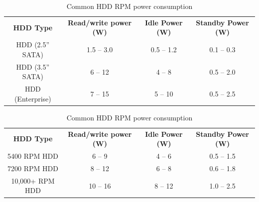 \begin{table}[H]
    \centering

    \begin{subtable}[t]{\textwidth}
        \centering
        \begin{tabular}{ |c|c|c|c| } 
            \hline
            \textbf{HDD Type} & \textbf{Read/write power (W)} & \textbf{Idle Power (W)} & \textbf{Standby Power (W)} \\
            \Xhline{1.5pt}
            HDD (2.5'' SATA) & 1.5 -- 3.0 & 0.5 -- 1.2 & 0.1 -- 0.3 \\
            \hline
            HDD (3.5'' SATA) & 6 -- 12 & 4 -- 8 & 0.5 -- 2.0 \\
            \hline
            HDD (Enterprise) & 7 -- 15 & 5 -- 10 & 0.5 -- 2.5 \\
            \hline
        \end{tabular}
        \caption[Typical HDD power consumption]{Typical HDD power consumption\parencite{storedbits_hdd}}
        \label{tab:Storage_power_HDD}
    \end{subtable}

    \vspace{1em}

    \begin{subtable}[t]{\textwidth}
        \centering
        \begin{tabular}{ |c|c|c|c| } 
            \hline
            \textbf{HDD Type} & \textbf{Read/write power (W)} & \textbf{Idle Power (W)} & \textbf{Standby Power (W)} \\
            \Xhline{1.5pt}
            5400 RPM HDD & 6 -- 9 & 4 -- 6 & 0.5 -- 1.5 \\
            \hline
            7200 RPM HDD & 8 -- 12 & 6 -- 8 & 0.6 -- 1.8 \\
            \hline
            10,000+ RPM HDD & 10 -- 16 & 8 -- 12 & 1.0 -- 2.5 \\
            \hline
        \end{tabular}
        \caption[Common HDD RPM power consumption]{Common HDD RPM power consumption\parencite{storedbits_hdd}}
        \label{tab:Storage_power_HDD_RPM}
    \end{subtable}

    \vspace{1em}


\end{table}
